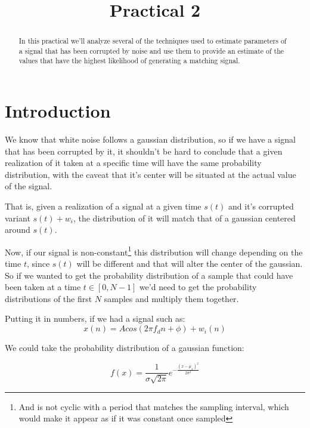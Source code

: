 \documentclass[conference,9pt]{IEEEtran}
\begin{document}
\title{Practical 2}

\author{
}


\maketitle
\begin{abstract}
In this practical we'll analyze several of the techniques used to estimate parameters of a signal that has been corrupted by noise and use them to provide an estimate of the values that have the highest likelihood of generating a matching signal.
\end{abstract}



\section{Introduction}

We know that white noise follows a gaussian distribution, so if we have a signal that has been corrupted by it, it shouldn't be hard to conclude that a given realization of it taken at a specific time will have the same probability distribution, with the caveat that it's center will be situated at the actual value of the signal. 

That is, given a realization of a signal at a given time $s(t)$ and it's corrupted variant $s(t)+w_i$, the distribution of it will match that of a gaussian centered around $s(t)$.

Now, if our signal is non-constant\footnote{And is not cyclic with a period that matches the sampling interval, which would make it appear as if it was constant once sampled} this distribution will change depending on the time $t$, since $s(t)$ will be different and that will alter the center of the gaussian. So if we wanted to get the probability distribution of a sample that could have been taken at a time $t\in [0, N-1]$ we'd need to get the probability distributions of the first $N$ samples and multiply them together.

Putting it in numbers, if we had a signal such as:
$$x(n) = Acos(2 \pi f_d n + \phi ) + w_i(n)$$

We could take the probability distribution of a gaussian function:

$$f(x)=\frac{1}{\sigma\sqrt{2\pi}}e^{-\frac{(x-\mu_x)^2}{2\sigma^2}}$$
\end{document}
